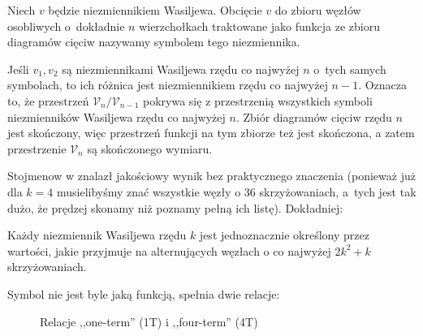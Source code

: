 \begin{definition}
%
    Niech $v$ będzie niezmiennikiem Wasiljewa.
    Obcięcie $v$ do zbioru węzłów osobliwych o~dokładnie $n$ wierzchołkach traktowane jako funkcja ze zbioru diagramów cięciw nazywamy symbolem tego niezmiennika.
\end{definition}

Jeśli $v_1, v_2$ są niezmiennikami Wasiljewa rzędu co najwyżej $n$ o~tych samych symbolach, to ich różnica jest niezmiennikiem rzędu co najwyżej $n - 1$.
Oznacza to, że przestrzeń $\mathcal V_n/\mathcal V_{n-1}$ pokrywa się z przestrzenią wszystkich symboli niezmienników Wasiljewa rzędu co najwyżej $n$.
Zbiór diagramów cięciw rzędu $n$ jest skończony, więc przestrzeń funkcji na tym zbiorze też jest skończona, a zatem przestrzenie $\mathcal V_n$ są skończonego wymiaru.

Stojmenow w \cite{stoimenowa2001} znalazł jakościowy wynik bez praktycznego znaczenia (ponieważ już dla $k = 4$ musielibyśmy znać wszystkie węzły o 36 skrzyżowaniach, a~tych jest tak dużo, że prędzej skonamy niż poznamy pełną ich listę).
%
Dokładniej:

\begin{proposition}
    Każdy niezmiennik Wasiljewa rzędu $k$ jest jednoznacznie określony przez wartości, jakie przyjmuje na alternujących węzłach o co najwyżej $2k^2 + k$ skrzyżowaniach.
\end{proposition}

Symbol nie jest byle jaką funkcją, spełnia dwie relacje:
%
\begin{figure}[H]
\begin{comment}
%
\begin{minipage}[b]{.065\linewidth}
    $\color{white}?$\hfill$\color{white}?$
\end{minipage}
%
\begin{minipage}[b]{.20\linewidth}
    \centering
    \MedLarOneTerm $= 0,$
\end{minipage}
%
\begin{minipage}[b]{.65\linewidth}
    \centering
    \MedLarFourTermA $-$ \MedLarFourTermB $=$ \MedLarFourTermC $-$ \MedLarFourTermD
\end{minipage}
%
\begin{minipage}[b]{.065\linewidth}
    $\color{white}?$\hfill$\color{white}?$
\end{minipage}
%
\end{comment}
    \caption{Relacje ,,one-term'' (1T) i ,,four-term'' (4T)}
\end{figure}

